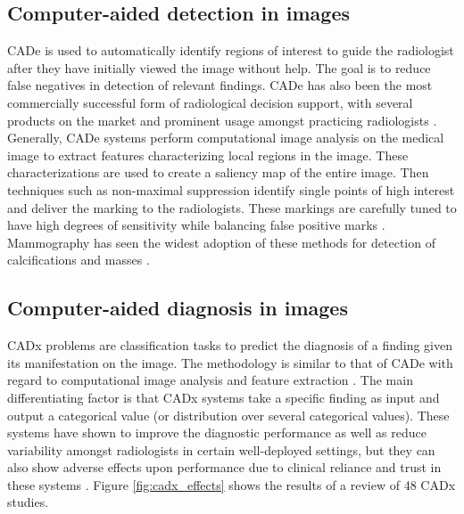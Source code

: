 \subsection{Computer-aided detection in images}
CADe is used to automatically identify regions of interest to guide the radiologist after they have initially viewed the image without help. The goal is to reduce false negatives in detection of relevant findings. CADe has also been the most commercially successful form of radiological decision support, with several products on the market and prominent usage amongst practicing radiologists \cite{Castellino:2005ke}. Generally, CADe systems perform computational image analysis on the medical image to extract features characterizing local regions in the image. These characterizations are used to create a saliency map of the entire image. Then techniques such as non-maximal suppression identify single points of high interest and deliver the marking to the radiologists. These markings are carefully tuned to have high degrees of sensitivity while balancing false positive marks \cite{Oliver:2010fm}. Mammography has seen the widest adoption of these methods for detection of calcifications and masses \cite{Cheng:2003ig,Castellino:2005ke,Meeuwis:2010bv,Oliver:2010fm,Fenton:2011fw,Fenton:2012kz,Jamieson:2012hz,Gallas:2012eg,Giger:2013jb}.


\subsection{Computer-aided diagnosis in images}

CADx problems are classification tasks to predict the diagnosis of a finding given its manifestation on the image. The methodology is similar to that of CADe with regard to computational image analysis and feature extraction \cite{Jiang:1999fj,Jiang:2001fy, Giger:2013jb, Eadie:2011cv}. The main differentiating factor is that CADx systems take a specific finding as input and output a categorical value (or distribution over several categorical values). These systems have shown to improve the diagnostic performance as well as reduce variability amongst radiologists \cite{Garg:2005cb} in certain well-deployed settings, but they can also show adverse effects upon performance due to clinical reliance and trust in these systems \cite{Eadie:2011cv,Giger:2013jb}. Figure \ref{fig:cadx_effects} shows the results of a review of 48 CADx studies.

